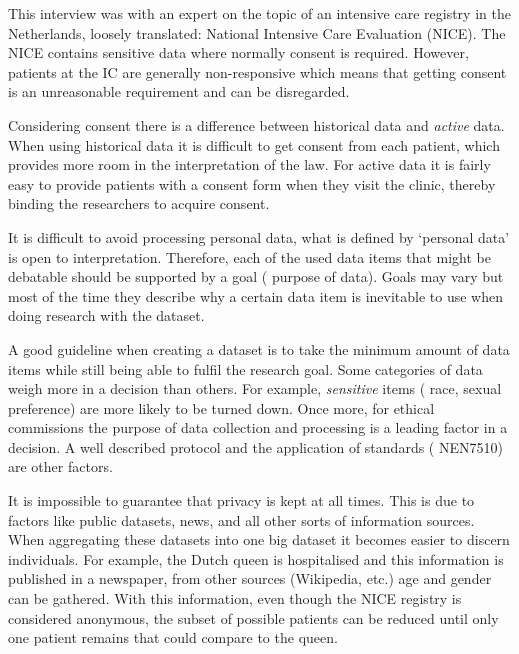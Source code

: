 This interview was with an expert on the topic of an intensive care registry in the Netherlands, loosely translated: National Intensive Care Evaluation (NICE).
The NICE contains sensitive data where normally consent is required. 
However, patients at the IC are generally non-responsive which means that getting consent is an unreasonable requirement and can be disregarded.

Considering consent there is a difference between historical data and \emph{active} data.
When using historical data it is difficult to get consent from each patient, which provides more room in the interpretation of the law.
For active data it is fairly easy to provide patients with a consent form when they visit the clinic, thereby binding the researchers to acquire consent.

It is difficult to avoid processing personal data, \ie{} what is defined by `personal data' is open to interpretation.
Therefore, each of the used data items that might be debatable should be supported by a goal (\ie{} purpose of data).
Goals may vary but most of the time they describe why a certain data item is inevitable to use when doing research with the dataset.

A good guideline when creating a dataset is to take the minimum amount of data items while still being able to fulfil the research goal.
Some categories of data weigh more in a decision than others.
For example, \emph{sensitive} items (\eg{} race, sexual preference) are more likely to be turned down.
Once more, for ethical commissions the purpose of data collection and processing is a leading factor in a decision. 
A well described protocol and the application of standards (\eg{} NEN7510) are other factors.

It is impossible to guarantee that privacy is kept at all times.
This is due to factors like public datasets, news, and all other sorts of information sources.
When aggregating these datasets into one big dataset it becomes easier to discern individuals. 
For example, the Dutch queen is hospitalised and this information is published in a newspaper, from other sources (Wikipedia, etc.) age and gender can be gathered.
With this information, even though the NICE registry is considered anonymous, the subset of possible patients can be reduced until only one patient remains that could compare to the queen.

